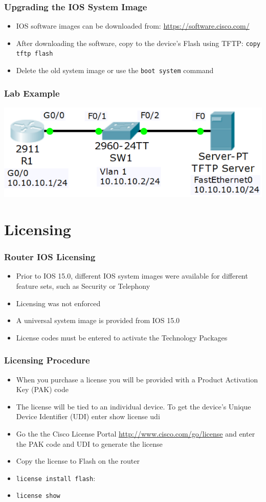 \documentclass[pdflatex,compress,mathserif]{beamer}
\begin{document}
\begin{frame}
	\frametitle{Upgrading the IOS System Image}
	\begin{itemize}
		\item IOS software images can be downloaded from: \hyperlink{https://software.cisco.com/}{https://software.cisco.com/}
		\item After downloading the software, copy to the device’s Flash using TFTP: \texttt{copy tftp flash}
		\item Delete the old system image or use the \texttt{boot system} command
	\end{itemize}
\end{frame}

\begin{frame}
	\frametitle{Lab Example}
	\begin{center}
		\includegraphics[width=0.7\linewidth]{img/img03}
	\end{center}
\end{frame}

\section{Licensing}

\begin{frame}
	\frametitle{Router IOS Licensing}
	\begin{itemize}
		\item Prior to IOS 15.0, different IOS system images were available for different feature sets, such as Security or Telephony
		\item Licensing was not enforced
		\item A universal system image is provided from IOS 15.0
		\item License codes must be entered to activate the Technology Packages
	\end{itemize}
\end{frame}

\begin{frame}
	\frametitle{Licensing Procedure}
	\begin{itemize}
		\item When you purchase a license you will be provided with a Product Activation Key (PAK) code
		\item The license will be tied to an individual device. To get the device's Unique Device Identifier (UDI) enter show license udi
		\item Go the the Cisco License Portal \hyperlink{http://www.cisco.com/go/license}{http://www.cisco.com/go/license} and enter the PAK code and UDI to generate the license
		\item Copy the license to Flash on the router
		\item \texttt{license install flash}:
		\item \texttt{license show}
	\end{itemize}
\end{frame}
\end{document}
